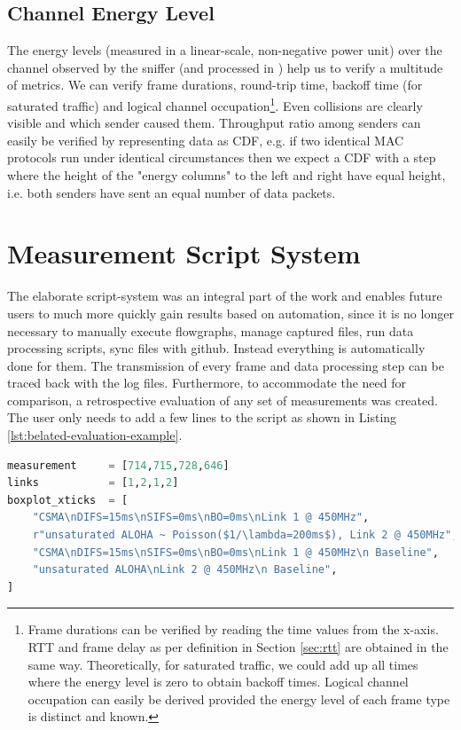 \subsection{Channel Energy Level}

The energy levels (measured in a linear-scale, non-negative power unit) over the channel observed by the sniffer (and processed in ) help us to verify a multitude of metrics. We can verify frame durations, round-trip time, backoff time (for saturated traffic) and logical channel occupation\footnote{Frame durations can be verified by reading the time values from the x-axis. RTT and frame delay as per definition in Section \ref{sec:rtt} are obtained in the same way. Theoretically, for saturated traffic, we could add up all times where the energy level is zero to obtain backoff times. Logical channel occupation can easily be derived provided the energy level of each frame type is distinct and known.}. Even collisions are clearly visible and which sender caused them. Throughput ratio among senders can easily be verified by representing data as CDF, e.g. if two identical MAC protocols run under identical circumstances then we expect a CDF with a step where the height of the "energy columns" to the left and right have equal height, i.e. both senders have sent an equal number of data packets.

\section{Measurement Script System}
\label{sec:script-system}

The elaborate script-system was an integral part of the work and enables future users to much more quickly gain results based on automation, since it is no longer necessary to manually execute flowgraphs, manage captured files, run data processing scripts, sync files with github. Instead everything is automatically done for them. The transmission of every frame and data processing step can be traced back with the log files. Furthermore, to accommodate the need for comparison, a retrospective evaluation of any set of measurements  was created. The user only needs to add a few lines to the script as shown in Listing \ref{lst:belated-evaluation-example}.
  
\begin{lstlisting}[language=Python,caption=Evaluation of measurements with \code{belated\_evaluation.py}. In \code{links} we denote the link we used in the corresponding measurement (compare Figure \ref{fig:measurement-setup}).,label=lst:belated-evaluation-example]
measurement     = [714,715,728,646]
links           = [1,2,1,2]
boxplot_xticks  = [
	"CSMA\nDIFS=15ms\nSIFS=0ms\nBO=0ms\nLink 1 @ 450MHz",
    r"unsaturated ALOHA ~ Poisson($1/\lambda=200ms$), Link 2 @ 450MHz",
    "CSMA\nDIFS=15ms\nSIFS=0ms\nBO=0ms\nLink 1 @ 450MHz\n Baseline",
    "unsaturated ALOHA\nLink 2 @ 450MHz\n Baseline",
]
\end{lstlisting}

